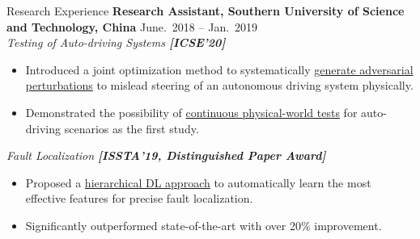 \begin{rSection}{Research Experience}
{\bf Research Assistant, Southern University of Science and Technology, China}  \hfill { June.~2018 -- Jan.~2019} \\
\textit{Testing of Auto-driving Systems \textbf{[{ICSE'20}]}}
\begin{itemize}[noitemsep,topsep=-5pt]
    \item Introduced a joint optimization method to systematically \underline{generate adversarial perturbations} to mislead steering of an autonomous driving system physically.
    \item Demonstrated the possibility of \underline{continuous physical-world tests} for auto-driving scenarios as the first study.
\end{itemize}
\textit{Fault Localization \textbf{[{ISSTA'19, Distinguished Paper Award}]}}
\begin{itemize}[noitemsep,topsep=-5pt]
    \item Proposed a \underline{hierarchical DL approach} to automatically learn the most effective features for precise fault localization. 
    \item Significantly outperformed state-of-the-art with over 20\% improvement. 
\end{itemize}
\end{rSection}
